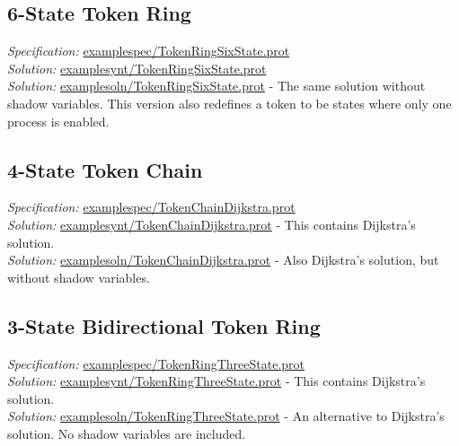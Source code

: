 \subsection{6-State Token Ring}

\textit{Specification:} \url{examplespec/TokenRingSixState.prot}
\\\textit{Solution:} \url{examplesynt/TokenRingSixState.prot}
\\\textit{Solution:} \url{examplesoln/TokenRingSixState.prot}
- The same solution without shadow variables.
This version also redefines a token to be states where only one process is enabled.

\subsection{4-State Token Chain}

\textit{Specification:} \url{examplespec/TokenChainDijkstra.prot}
\\\textit{Solution:} \url{examplesynt/TokenChainDijkstra.prot}
- This contains Dijkstra's solution.
\\\textit{Solution:} \url{examplesoln/TokenChainDijkstra.prot}
- Also Dijkstra's solution, but without shadow variables.

\subsection{3-State Bidirectional Token Ring}

\textit{Specification:} \url{examplespec/TokenRingThreeState.prot}
\\\textit{Solution:} \url{examplesynt/TokenRingThreeState.prot}
- This contains Dijkstra's solution.
\\\textit{Solution:} \url{examplesoln/TokenRingThreeState.prot}
- An alternative to Dijkstra's solution.
No shadow variables are included.



